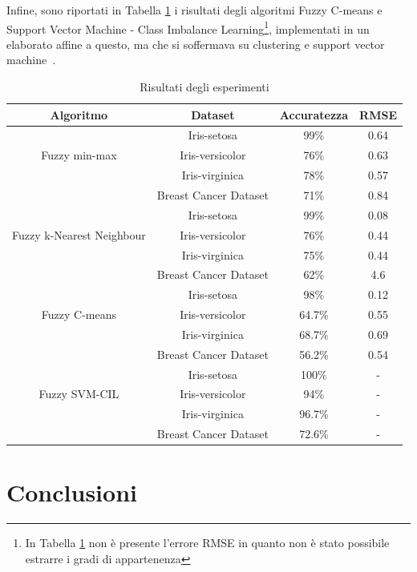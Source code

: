 \documentclass[11pt,  oneside, openany]{book}
\begin{document}
Infine, sono riportati in Tabella \ref{table:exper} i risultati degli algoritmi Fuzzy C-means e Support Vector Machine - Class Imbalance Learning\footnote{In Tabella \ref{table:exper} non è presente l'errore RMSE in quanto non è stato possibile estrarre i gradi di appartenenza}, implementati in un elaborato affine a questo, ma che si soffermava su clustering e support vector machine~\cite{bib:alessia}. 


\begin{table}[h!]
\centering
\begin{tabular}{ |c|c|c|c| } 
\hline
\textbf{Algoritmo} & \textbf{Dataset} & \textbf{Accuratezza} & \textbf{RMSE} \\
\hline
\hline
\multirow{3}{14em}{Fuzzy min-max}  & Iris-setosa & 99\% & 0.64 \\
& Iris-versicolor & 76\% & 0.63 \\
& Iris-virginica & 78\% & 0.57 \\
& Breast Cancer Dataset & 71\%  & 0.84 \\
\hline
\multirow{3}{14em}{Fuzzy k-Nearest Neighbour} &  Iris-setosa & 99\% & 0.08 \\
& Iris-versicolor & 76\% & 0.44 \\
& Iris-virginica & 75\% & 0.44 \\
& Breast Cancer Dataset & 62\% & 4.6 \\             
\hline
\multirow{3}{14em}{Fuzzy C-means}  & Iris-setosa & 98\% & 0.12\\
&Iris-versicolor & 64.7\% & 0.55\\
& Iris-virginica & 68.7\% & 0.69\\
& Breast Cancer Dataset &  56.2\% & 0.54\\
\hline
\multirow{3}{14em}{Fuzzy SVM-CIL}  & Iris-setosa & 100\% & - \\
& Iris-versicolor & 94\% & - \\
& Iris-virginica & 96.7\% & - \\
& Breast Cancer Dataset &  72.6\% & - \\
\hline
\end{tabular}
\caption{Risultati degli esperimenti}
\label{table:exper}
\end{table}



	\chapter*{Conclusioni}
\end{document}
